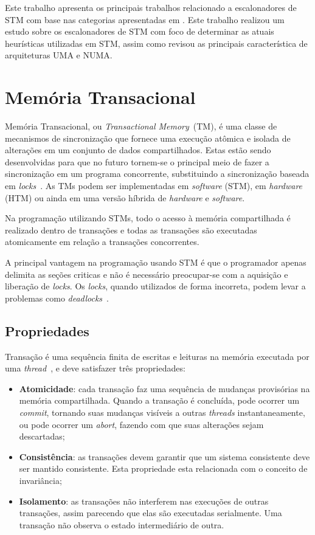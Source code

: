 \documentclass[ti]{texufpel}
\begin{document}
Este trabalho apresenta os principais trabalhos relacionado a escalonadores de STM com base nas categorias apresentadas em \cite{sanzo17}. Este trabalho realizou um estudo sobre os escalonadores de STM com foco de determinar as atuais heurísticas utilizadas em STM, assim como revisou as principais característica de arquiteturas UMA e NUMA.

\chapter{Memória Transacional}

Memória Transacional, ou \emph{Transactional Memory}~(TM), é uma classe de mecanismos de sincronização que fornece uma execução atômica e isolada de alterações em um conjunto de dados compartilhados. Estas estão sendo desenvolvidas para que no futuro tornem-se o principal meio de fazer a sincronização em um programa concorrente, substituindo a sincronização baseada em \emph{locks}~\cite{herlihy06}. As TMs podem ser implementadas em \emph{software} (STM), em \emph{hardware} (HTM) ou ainda em uma versão híbrida de \emph{hardware} e \emph{software}.

Na programação utilizando STMs, todo o acesso à memória compartilhada é realizado dentro de transações e todas as transações são executadas atomicamente em relação a transações concorrentes.

A principal vantagem na programação usando STM é que o programador apenas delimita as seções criticas e não é necessário preocupar-se com a aquisição e liberação de \emph{locks}. Os \emph{locks}, quando utilizados de forma incorreta, podem levar a problemas como \emph{deadlocks}~\cite{bandeira10}.

\section{Propriedades}

Transação é uma sequência finita de escritas e leituras na memória executada por uma \emph{thread}~\cite{herlihy93}, e deve satisfazer três propriedades:

\begin{itemize}
 \item \textbf{Atomicidade}: cada transação faz uma sequência de mudanças provisórias na memória compartilhada. Quando a transação é concluída, pode ocorrer um \emph{commit}, tornando suas mudanças visíveis a outras \emph{threads} instantaneamente, ou pode ocorrer um \emph{abort}, fazendo com que suas alterações sejam descartadas;

 \item \textbf{Consistência}: as transações devem garantir que um sistema consistente deve ser mantido consistente. Esta propriedade esta relacionada com o conceito de invariância;

 \item \textbf{Isolamento}: as transações não interferem nas execuções de outras transações, assim parecendo que elas são executadas serialmente. Uma transação não observa o estado intermediário de outra.
\end{itemize}
\end{document}
